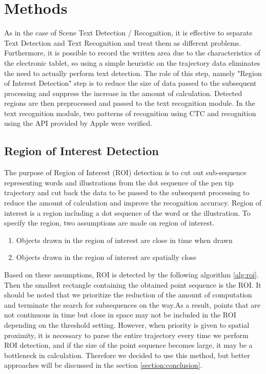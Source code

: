 \section{Methods}
\label{section:methods}

As in the case of Scene Text Detection / Recognition, it is effective to separate Text Detection
and Text Recognition and treat them as different problems.
Furthermore, it is possible to record the written area due to the characteristics of the electronic tablet,
so using a simple heuristic on the trajectory data eliminates the need to actually perform text detection.
The role of this step, namely "Region of Interest Detection" step is to reduce the size of data
passed to the subsequent processing and suppress the increase in the amount of calculation.
Detected regions are then preprocessed and passed to the text recognition module. In the text recognition module,
two patterns of recognition using CTC and recognition using the API provided by Apple were verified.

\subsection{Region of Interest Detection}

The purpose of Region of Interest (ROI) detection is to cut out sub-sequence
representing words and illustrations from the dot sequence of the pen tip trajectory
and cut back the data to be passed to the subsequent processing to
reduce the amount of calculation and improve the recognition accuracy.
Region of interest is a region including a dot sequence of the word or the illustration.
To specify the region, two assumptions are made on region of interest.

\begin{enumerate}
    \item Objects drawn in the region of interest are close in time when drawn
    \item Objects drawn in the region of interest are spatially close
\end{enumerate}

Based on these assumptions, ROI is detected by the following algorithm \ref{alg:roi}.
Then the smallest rectangle containing the obtained point sequence is the ROI.
It should be noted that we prioritize the reduction of the amount of computation and
terminate the search for subsequences on the way.As a result, points that are not continuous
in time but close in space may not be included in the ROI depending on the threshold setting.
However, when priority is given to spatial proximity, it is necessary to parse the entire
trajectory every time we perform ROI detection, and if the size of the point sequence becomes large,
it may be a bottleneck in calculation. Therefore we decided to use this method,
but better approaches will be discussed in the section \ref{section:conclusion}.

